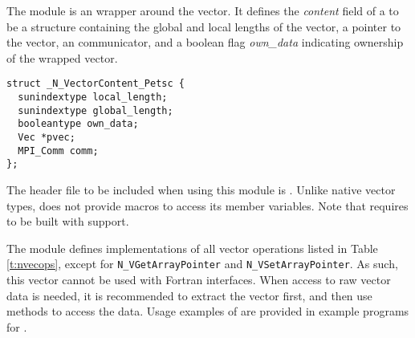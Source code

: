 %
The {\nvecpetsc} module is an {\nvector} wrapper around the {\petsc} vector.
It defines the {\em content} field of a  to be a structure containing
the global and local lengths of the vector, a pointer to the {\petsc} vector,
an {\mpi} communicator, and a boolean flag {\em own\_data} indicating ownership of 
the wrapped {\petsc} vector.
\begin{verbatim} 
struct _N_VectorContent_Petsc {
  sunindextype local_length;
  sunindextype global_length;
  booleantype own_data;
  Vec *pvec;
  MPI_Comm comm;
};
\end{verbatim}

The header file to be included when using this module is .
Unlike native {\sundials} vector types, {\nvecpetsc} does not provide macros 
to access its member variables.
Note that {\nvecpetsc} requires {\sundials} to be built with {\mpi} support.


The {\nvecpetsc} module defines implementations of all vector operations listed 
in Table \ref{t:nvecops}, except for \verb|N_VGetArrayPointer| and 
\verb|N_VSetArrayPointer|. As such, this vector cannot be used with {\sundials} Fortran interfaces.
When access to raw vector data is needed, it is 
recommended to extract the {\petsc} vector first, and then use {\petsc} 
methods to access the data. Usage examples of {\nvecpetsc} are provided in 
example programs for {\ida} \cite{ida_ex}.

